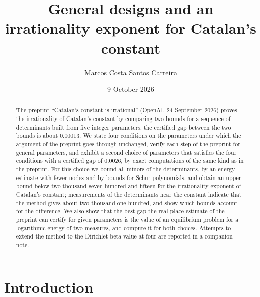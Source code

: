 \documentclass[11pt]{article}
\title{General designs and an irrationality exponent for Catalan's constant}
\author{Marcos Costa Santos Carreira}
\date{9 October 2026}
\theoremstyle{definition}
\begin{document}
\maketitle

\begin{abstract}
The preprint ``Catalan's constant is irrational'' (OpenAI, 24 September 2026) proves the irrationality of Catalan's constant by comparing two bounds for a sequence of determinants built from five integer parameters; the certified gap between the two bounds is about 0.00013. We state four conditions on the parameters under which the argument of the preprint goes through unchanged, verify each step of the preprint for general parameters, and exhibit a second choice of parameters that satisfies the four conditions with a certified gap of 0.0026, by exact computations of the same kind as in the preprint. For this choice we bound all minors of the determinants, by an energy estimate with fewer nodes and by bounds for Schur polynomials, and obtain an upper bound below two thousand seven hundred and fifteen for the irrationality exponent of Catalan's constant; measurements of the determinants near the constant indicate that the method gives about two thousand one hundred, and show which bounds account for the difference. We also show that the best gap the real-place estimate of the preprint can certify for given parameters is the value of an equilibrium problem for a logarithmic energy of two measures, and compute it for both choices. Attempts to extend the method to the Dirichlet beta value at four are reported in a companion note.
\end{abstract}

\section{Introduction}
\end{document}
